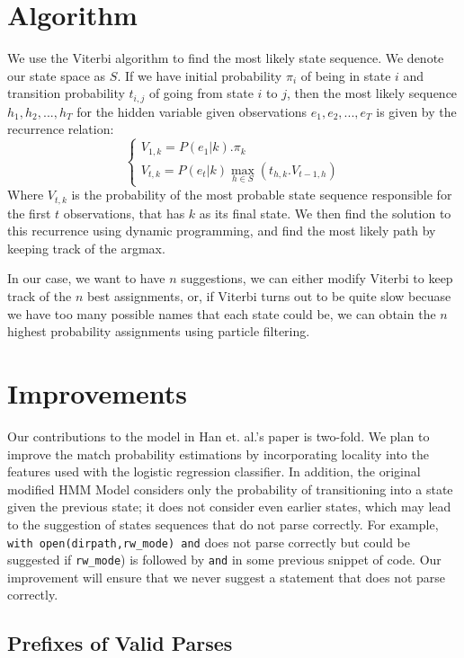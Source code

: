 \documentclass[10pt]{article}
\begin{document}
\section{Algorithm}

	We use the Viterbi algorithm to find the most likely state sequence.
We denote our state space as $S$. If we have initial probability $\pi_i$ of being in state $i$ and transition probability $t_{i,j}$ of going from state $i$ to $j$, then the most likely sequence $h_1, h_2, ..., h_T$ for the hidden variable given observations $e_1, e_2, ..., e_T$ is given by the recurrence relation:
    \[
    	\begin{cases}
        	V_{1,k} = P(e_1|k).\pi_k \\
            V_{t,k} = P(e_t | k) \underset{h \in S}\max(t_{h,k}.V_{t-1,h})
        \end{cases}
    \]
    Where $V_{t,k}$ is the probability of the most probable state sequence responsible for the first $t$ observations, that has $k$ as its final state. We then find the solution to this recurrence using dynamic programming, and find the most likely path by keeping track of the argmax.

	In our case, we want to have $n$ suggestions, we can either modify Viterbi to keep track of the $n$ best assignments, or, if Viterbi turns out to be quite slow becuase we have too many possible names that each state could be, we can obtain the $n$ highest probability assignments using particle filtering.
    
\section{Improvements}

Our contributions to the model in Han et. al.'s paper is two-fold. We plan to improve the match probability estimations by incorporating locality into the features used with the logistic regression classifier. In addition, the original modified HMM Model considers only the probability of transitioning into a state given the previous state; it does not consider even earlier states, which may lead to the suggestion of states sequences that do not parse correctly. For example, \texttt{with open(dirpath,rw\_mode) and} does not parse correctly but could be suggested if \texttt{rw\_mode}) is followed by \texttt{and} in some previous snippet of code. Our improvement will ensure that we never suggest a statement that does not parse correctly.  

\subsection{Prefixes of Valid Parses}
\end{document}
